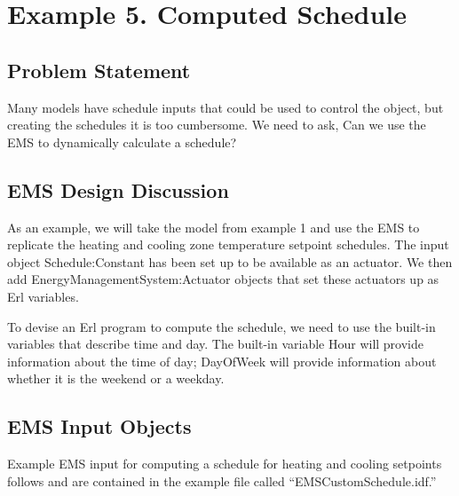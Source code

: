 \section{Example 5. Computed Schedule}\label{example-5.-computed-schedule}

\subsection{Problem Statement}\label{problem-statement-007}

Many models have schedule inputs that could be used to control the object, but creating the schedules it is too cumbersome. We need to ask, Can we use the EMS to dynamically calculate a schedule?

\subsection{EMS Design Discussion}\label{ems-design-discussion-007}

As an example, we will take the model from example 1 and use the EMS to replicate the heating and cooling zone temperature setpoint schedules. The input object Schedule:Constant has been set up to be available as an actuator. We then add EnergyManagementSystem:Actuator objects that set these actuators up as Erl variables.

To devise an Erl program to compute the schedule, we need to use the built-in variables that describe time and day. The built-in variable Hour will provide information about the time of day; DayOfWeek will provide information about whether it is the weekend or a weekday.

\subsection{EMS Input Objects}\label{ems-input-objects-007}

Example EMS input for computing a schedule for heating and cooling setpoints follows and are contained in the example file called ``EMSCustomSchedule.idf.''

